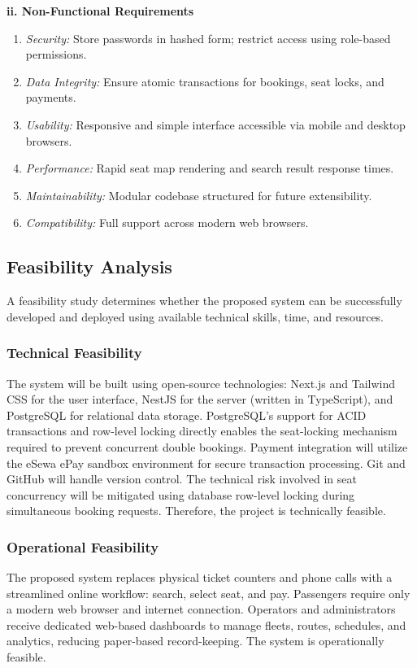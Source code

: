 \textbf{ii. Non-Functional Requirements}
\begin{enumerate}
	\item \textit{Security:} Store passwords in hashed form; restrict access using role-based permissions.
	\item \textit{Data Integrity:} Ensure atomic transactions for bookings, seat locks, and payments.
	\item \textit{Usability:} Responsive and simple interface accessible via mobile and desktop browsers.
	\item \textit{Performance:} Rapid seat map rendering and search result response times.
	\item \textit{Maintainability:} Modular codebase structured for future extensibility.
	\item \textit{Compatibility:} Full support across modern web browsers.
\end{enumerate}

\subsection{Feasibility Analysis}

A feasibility study determines whether the proposed system can be successfully developed and deployed using available technical skills, time, and resources.

\subsubsection{Technical Feasibility}
The system will be built using open-source technologies: Next.js and Tailwind CSS for the user interface, NestJS for the server (written in TypeScript), and PostgreSQL for relational data storage. PostgreSQL's support for ACID transactions and row-level locking directly enables the seat-locking mechanism required to prevent concurrent double bookings. Payment integration will utilize the eSewa ePay sandbox environment for secure transaction processing. Git and GitHub will handle version control. The technical risk involved in seat concurrency will be mitigated using database row-level locking during simultaneous booking requests. Therefore, the project is technically feasible.

\subsubsection{Operational Feasibility}
The proposed system replaces physical ticket counters and phone calls with a streamlined online workflow: search, select seat, and pay. Passengers require only a modern web browser and internet connection. Operators and administrators receive dedicated web-based dashboards to manage fleets, routes, schedules, and analytics, reducing paper-based record-keeping. The system is operationally feasible.

